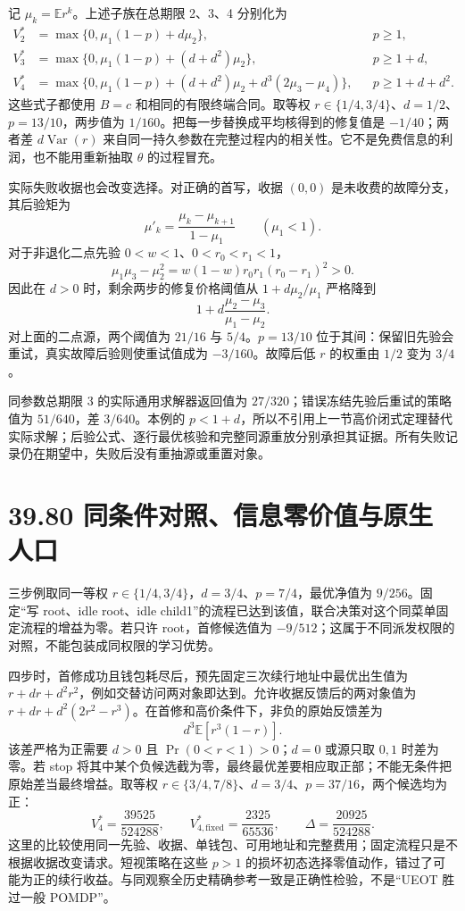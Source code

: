 \documentclass[
  11pt,
  oneside]{book}
\begin{document}
记 \(\mu_k=\mathbb E r^k\)。上述子族在总期限 2、3、4 分别化为 \[\begin{aligned}
V_2^*&=\max\{0,\mu_1(1-p)+d\mu_2\},&&p\ge1,\\
V_3^*&=\max\{0,\mu_1(1-p)+(d+d^2)\mu_2\},&&p\ge1+d,\\
V_4^*&=\max\{0,\mu_1(1-p)+(d+d^2)\mu_2
             +d^3(2\mu_3-\mu_4)\},&&p\ge1+d+d^2.
\end{aligned}\] 这些式子都使用 \(B=c\) 和相同的有限终端合同。取等权 \(r\in\{1/4,3/4\}\)、\(d=1/2\)、\(p=13/10\)，两步值为 \(1/160\)。把每一步替换成平均核得到的修复值是 \(-1/40\)；两者差 \(d\operatorname{Var}(r)\) 来自同一持久参数在完整过程内的相关性。它不是免费信息的利润，也不能用重新抽取 \(\theta\) 的过程冒充。

实际失败收据也会改变选择。对正确的首写，收据 \((0,0)\) 是未收费的故障分支，其后验矩为 \[\mu'_k=\frac{\mu_k-\mu_{k+1}}{1-\mu_1}
\qquad(\mu_1<1).\] 对于非退化二点先验 \(0<w<1\)、\(0<r_0<r_1<1\)， \[\mu_1\mu_3-\mu_2^2=w(1-w)r_0r_1(r_0-r_1)^2>0.\] 因此在 \(d>0\) 时，剩余两步的修复价格阈值从 \(1+d\mu_2/\mu_1\) 严格降到 \[1+d\frac{\mu_2-\mu_3}{\mu_1-\mu_2}.\] 对上面的二点源，两个阈值为 \(21/16\) 与 \(5/4\)。\(p=13/10\) 位于其间：保留旧先验会重试，真实故障后验则使重试值成为 \(-3/160\)。故障后低 \(r\) 的权重由 \(1/2\) 变为 \(3/4\)。

同参数总期限 3 的实际通用求解器返回值为 \(27/320\)；错误冻结先验后重试的策略值为 \(51/640\)，差 \(3/640\)。本例的 \(p<1+d\)，所以不引用上一节高价闭式定理替代实际求解；后验公式、逐行最优核验和完整同源重放分别承担其证据。所有失败记录仍在期望中，失败后没有重抽源或重置对象。

\section{39.80 同条件对照、信息零价值与原生人口}\label{ux540cux6761ux4ef6ux5bf9ux7167ux4fe1ux606fux96f6ux4ef7ux503cux4e0eux539fux751fux4ebaux53e3}

三步例取同一等权 \(r\in\{1/4,3/4\}\)，\(d=3/4\)、\(p=7/4\)，最优净值为 \(9/256\)。固定``写 root、idle root、idle child1''的流程已达到该值，联合决策对这个同菜单固定流程的增益为零。若只许 root，首修候选值为 \(-9/512\)；这属于不同派发权限的对照，不能包装成同权限的学习优势。

四步时，首修成功且钱包耗尽后，预先固定三次续行地址中最优出生值为 \(r+dr+d^2r^2\)，例如交替访问两对象即达到。允许收据反馈后的两对象值为 \(r+dr+d^2(2r^2-r^3)\)。在首修和高价条件下，非负的原始反馈差为 \[d^3\mathbb E[r^3(1-r)].\] 该差严格为正需要 \(d>0\) 且 \(\Pr(0<r<1)>0\)；\(d=0\) 或源只取 \(0,1\) 时差为零。若 stop 将其中某个负候选截为零，最终最优差要相应取正部；不能无条件把原始差当最终增益。取等权 \(r\in\{3/4,7/8\}\)、\(d=3/4\)、\(p=37/16\)，两个候选均为正： \[V_4^*=\frac{39525}{524288},\qquad
V_{4,\mathrm{fixed}}^*=\frac{2325}{65536},\qquad
\Delta=\frac{20925}{524288}.\] 这里的比较使用同一先验、收据、单钱包、可用地址和完整费用；固定流程只是不根据收据改变请求。短视策略在这些 \(p>1\) 的损坏初态选择零值动作，错过了可能为正的续行收益。与同观察全历史精确参考一致是正确性检验，不是``UEOT 胜过一般 POMDP''。
\end{document}
